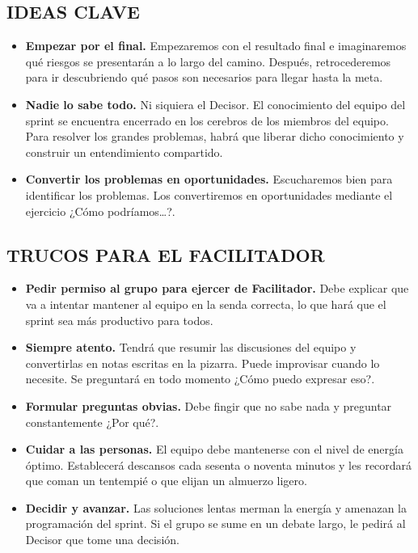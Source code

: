 \documentclass[10pt]{article}
\begin{document}
\begin{multicols}{2}
\subsection*{IDEAS CLAVE}
\begin{itemize}
\item  \textbf{Empezar por el final.} Empezaremos con el resultado final e imaginaremos qué riesgos se presentarán a lo largo del camino. Después, retrocederemos para ir descubriendo qué pasos son necesarios para llegar hasta la meta.
\item \textbf{Nadie lo sabe todo.} Ni siquiera el Decisor. El conocimiento del equipo del sprint se encuentra encerrado en los cerebros de los miembros del equipo. Para resolver los grandes problemas, habrá que liberar dicho conocimiento y construir un entendimiento compartido.
\item \textbf{Convertir los problemas en oportunidades.} Escucharemos bien para identificar los problemas. Los convertiremos en oportunidades mediante el ejercicio ¿Cómo podríamos…?.
\end{itemize}
\subsection*{TRUCOS PARA EL FACILITADOR}
\begin{itemize}
\item \textbf{Pedir permiso al grupo para ejercer de Facilitador.} Debe explicar que va a intentar mantener al equipo en la senda correcta, lo que hará que el sprint sea más productivo para todos.
\item \textbf{Siempre atento.} Tendrá que resumir las discusiones del equipo y convertirlas en notas escritas en la pizarra. Puede improvisar cuando lo necesite. Se preguntará en todo momento ¿Cómo
puedo expresar eso?.
\item \textbf{Formular preguntas obvias.} Debe fingir que no sabe nada y preguntar constantemente ¿Por qué?.
\item \textbf{Cuidar a las personas.} El equipo debe mantenerse con el nivel de energía óptimo. Establecerá descansos cada sesenta o noventa minutos y les recordará que coman un tentempié o que elijan un almuerzo ligero.
\item \textbf{Decidir y avanzar.} Las soluciones lentas merman la energía y amenazan la programación del sprint. Si el grupo se sume en un debate largo, le pedirá al Decisor que tome una decisión.
\end{itemize}
\end{multicols}
\end{document}
